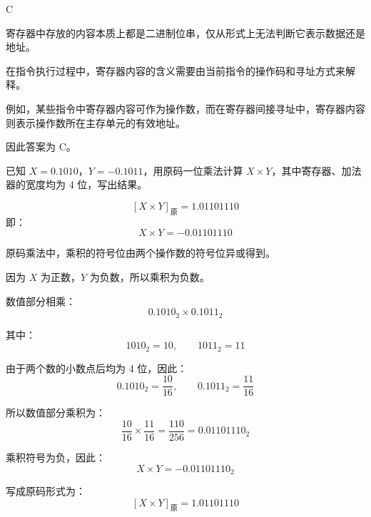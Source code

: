 \begin{answer}
C
\end{answer}

\begin{analysisenv}
寄存器中存放的内容本质上都是二进制位串，仅从形式上无法判断它表示数据还是地址。

在指令执行过程中，寄存器内容的含义需要由当前指令的操作码和寻址方式来解释。

例如，某些指令中寄存器内容可作为操作数，而在寄存器间接寻址中，寄存器内容则表示操作数所在主存单元的有效地址。

因此答案为 C。
\end{analysisenv}





\begin{question}
已知 \(X = 0.1010\)，\(Y = -0.1011\)，用原码一位乘法计算 \(X \times Y\)，其中寄存器、加法器的宽度均为 4 位，写出结果。
\end{question}

\begin{answer}
\[
[X \times Y]_{\text{原}} = 1.01101110
\]
即：
\[
X \times Y = -0.01101110
\]
\end{answer}

\begin{analysisenv}
原码乘法中，乘积的符号位由两个操作数的符号位异或得到。

因为 \(X\) 为正数，\(Y\) 为负数，所以乘积为负数。

数值部分相乘：
\[
0.1010_2 \times 0.1011_2
\]

其中：
\[
1010_2 = 10,\qquad 1011_2 = 11
\]

由于两个数的小数点后均为 4 位，因此：
\[
0.1010_2 = \frac{10}{16},\qquad 0.1011_2 = \frac{11}{16}
\]

所以数值部分乘积为：
\[
\frac{10}{16} \times \frac{11}{16}
= \frac{110}{256}
= 0.01101110_2
\]

乘积符号为负，因此：
\[
X \times Y = -0.01101110_2
\]

写成原码形式为：
\[
[X \times Y]_{\text{原}} = 1.01101110
\]
\end{analysisenv}

